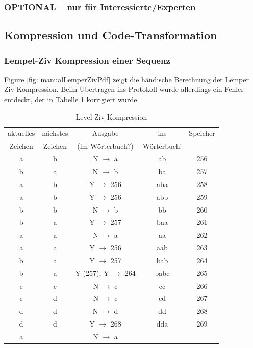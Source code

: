 \documentclass[12pt,german]{article}
\begin{document}
\subsubsection{OPTIONAL – nur für Interessierte/Experten}


\subsection{Kompression und Code-Transformation}
\subsubsection{Lempel-Ziv Kompression einer Sequenz}
Figure \ref{fig: manualLemperZivPdf} zeigt die händische Berechnung der Lemper Ziv Kompression. Beim Übertragen ins Protokoll wurde allerdings ein Fehler entdeckt, der in Tabelle \ref{tab:Level Ziv Kompression} korrigiert wurde.




\label{fig: manualLemperZivPdf}


\begin{table}[H]
  \centering
  \begin{tabular}{c | c | c | c | c |}
    \hline
   	aktuelles  & nächstes  & Ausgabe  & ins & Speicher \\
   	 Zeichen &  Zeichen &  (im Wörterbuch?) & Wörterbuch! &  \\
	a & b & N $ \rightarrow $ a & ab & 256 \\
	b & a & N $ \rightarrow $ b & ba & 257 \\
	a & b & Y $ \rightarrow $ 256 & aba & 258 \\
	a & b & Y $ \rightarrow $ 256 & abb & 259 \\
	b & b & N $ \rightarrow $ b & bb & 260 \\
	b & a & Y $ \rightarrow $ 257 & baa & 261 \\
	a & a & N $ \rightarrow $ a & aa & 262 \\
	a & a & Y $ \rightarrow $ 256 & aab & 263 \\
	b & a & Y $ \rightarrow $ 257 & bab & 264 \\
	b & a & Y (257), Y $ \rightarrow $ 264 & babc & 265 \\
	c & c & N $ \rightarrow $ c & cc & 266 \\
	c & d & N $ \rightarrow $ c & cd & 267 \\
	d & d & N $ \rightarrow $ d & dd & 268 \\
	d & d & Y $ \rightarrow $ 268 & dda & 269 \\
	a &   & N $ \rightarrow $ a &     &   \\ 
   	
  \end{tabular}
  \caption{Level Ziv Kompression}
  \label{tab:Level Ziv Kompression}
\end{table}
\end{document}
